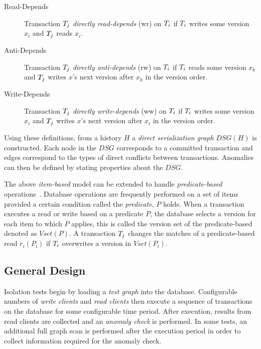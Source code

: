 \begin{description}
  \item[Read-Depends]
    Transaction $T_j$ \emph{directly read-depends} (\textsf{wr}) on
    $T_i$ if $T_i$ writes some version $x_i$ and $T_j$ reads $x_i$.
  \item[Anti-Depends]
    Transaction $T_j$ \emph{directly anti-depends} (\textsf{rw}) on
    $T_i$ if $T_i$ reads some version $x_k$ and $T_j$ writes
    $x$'s next version after $x_k$ in the version order.
  \item[Write-Depends]
    Transaction $T_j$ \emph{directly write-depends} (\textsf{ww}) on
    $T_i$ if $T_i$ writes some version $x_i$ and $T_j$ writes
    $x$'s next version after $x_i$ in the version order.
\end{description}


Using these definitions, from a history $H$ a \emph{direct serialization graph}
$\textit{DSG}(H)$ is constructed. Each node in the $\textit{DSG}$ corresponds to
a committed transaction and edges correspond to the types of direct conflicts
between transactions. Anomalies can then be defined by stating properties about
the $\textit{DSG}$.

The above \emph{item-based} model can be extended to handle
\emph{predicate-based} operations~\cite{adya1999weak}. Database operations are
frequently performed on a set of items provided a certain condition called the
\emph{predicate}, $P$ holds. When a transaction executes a read or write based
on a predicate $P$, the database selects a version for each item to which $P$
applies, this is called the version set of the predicate-based denoted as
$\textit{Vset}(P)$. A transaction $T_j$ changes the matches of a
predicate-based read $r_i(P_i)$ if $T_i$ overwrites a version
in $\textit{Vset}(P_i)$.

\subsection{General Design}
\label{sec:design-cons}

Isolation tests begin by loading a \emph{test graph} into the database.
Configurable numbers of \emph{write clients} and \emph{read clients} then
execute a sequence of transactions on the database for some configurable time
period. After execution, results from read clients are collected and an
\emph{anomaly check} is performed. In some tests, an additional full graph scan
is performed after the execution period in order to collect information required
for the anomaly check.

